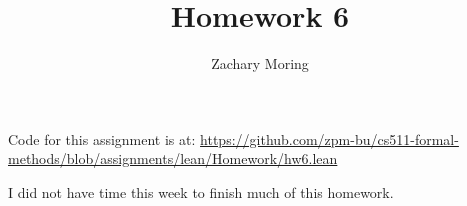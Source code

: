 \documentclass{article}
\title{Homework 6}
\author{Zachary Moring}
\begin{document}
 \maketitle

Code for this assignment is at: \url{https://github.com/zpm-bu/cs511-formal-methods/blob/assignments/lean/Homework/hw6.lean}

\vspace{1in}

I did not have time this week to finish much of this homework.
\end{document}
